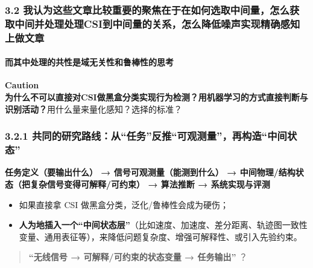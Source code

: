 \documentclass[
]{article}
\begin{document}
\subsubsection{3.2
我认为这些文章比较重要的聚焦在于在如何选取中间量，怎么获取中间并处理处理CSI到中间量的关系，怎么降低噪声实现精确感知上做文章}\label{32-ux6211ux8ba4ux4e3aux8fd9ux4e9bux6587ux7ae0ux6bd4ux8f83ux91cdux8981ux7684ux805aux7126ux5728ux4e8eux5728ux5982ux4f55ux9009ux53d6ux4e2dux95f4ux91cfux600eux4e48ux83b7ux53d6ux4e2dux95f4ux5e76ux5904ux7406ux5904ux7406csiux5230ux4e2dux95f4ux91cfux7684ux5173ux7cfbux600eux4e48ux964dux4f4eux566aux58f0ux5b9eux73b0ux7cbeux786eux611fux77e5ux4e0aux505aux6587ux7ae0}

\paragraph{而其中处理的共性是域无关性和鲁棒性的思考}\label{ux800cux5176ux4e2dux5904ux7406ux7684ux5171ux6027ux662fux57dfux65e0ux5173ux6027ux548cux9c81ux68d2ux6027ux7684ux601dux8003}

\textbf{Caution}\\

\textbf{为什么不可以直接对CSI做黑盒分类实现行为检测？用机器学习的方式直接判断与识别活动？}用什么量来量化感知？选择的标准？

\subsubsection{3.2.1
共同的研究路线：从``任务''反推``可观测量''，再构造``中间状态''}\label{321-ux5171ux540cux7684ux7814ux7a76ux8defux7ebfux4eceux4efbux52a1ux53cdux63a8ux53efux89c2ux6d4bux91cfux518dux6784ux9020ux4e2dux95f4ux72b6ux6001}

\textbf{任务定义（要输出什么） → 信号可观测量（能测到什么） →
中间物理/结构状态（把复杂信号变得可解释/可约束） → 算法推断 →
系统实现与评测}

\begin{itemize}
\item
  如果直接拿 CSI 做黑盒分类，泛化/鲁棒性会成为硬伤；
\item
  \textbf{人为地插入一个``中间状态层''}（比如速度、加速度、差分距离、轨迹图一致性变量、通用表征等），来降低问题复杂度、增强可解释性、或引入先验约束。
\end{itemize}

\begin{quote}
\textbf{``无线信号 → 可解释/可约束的状态变量 → 任务输出''} ？
\end{quote}
\end{document}
